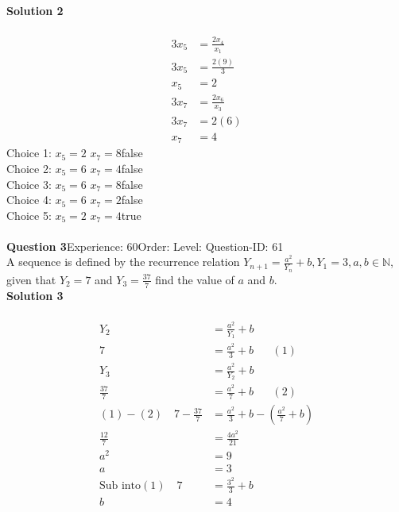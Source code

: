 \documentclass{article}
\begin{document}
\noindent\textbf{Solution 2}\\[2pt]
\\[-35pt]\begin{align*}
3x_5&=\displaystyle\frac{2x_{4}}{x_1}\\[2pt]
3x_5&=\displaystyle\frac{2(9)}{3}\\[2pt]
x_5&=2\\[12pt]
3x_7&=\displaystyle\frac{2x_6}{x_3}\\[2pt]
3x_7&=2(6)\\[2pt]
x_7&=4
\end{align*}
Choice 1: \hspace{20pt}$x_5=2 \,\, x_7=8$\hspace{20pt}false\\
Choice 2: \hspace{20pt}$x_5=6 \,\, x_7=4$\hspace{20pt}false\\
Choice 3: \hspace{20pt}$x_5=6 \,\, x_7=8$\hspace{20pt}false\\
Choice 4: \hspace{20pt}$x_5=6 \,\, x_7=2$\hspace{20pt}false\\
Choice 5: \hspace{20pt}$x_5=2 \,\, x_7=4$\hspace{20pt}true\\
\\[4pt]
\noindent\textbf{Question 3}\hspace{20pt}Experience: 60\hspace{20pt}Order: \hspace{20pt}Level: \hspace{20pt}Question-ID: 61\\[2pt]
A sequence is defined by the recurrence relation $Y_{n+1}=\displaystyle\frac{a^2}{Y_n}+b, Y_1=3, a,b \in \mathbb{N}$, given that $Y_2=7$ and $Y_3=\displaystyle\frac{37}{7}$ find the value of $a$ and $b$.\\[4pt]
\noindent\textbf{Solution 3}\\[2pt]
\\[-35pt]\begin{align*}
Y_2&=\displaystyle\frac{a^2}{Y_1}+b\\[2pt]
7&=\displaystyle\frac{a^2}{3}+b\hspace{20pt}(1)\\[12pt]
Y_3&=\displaystyle\frac{a^2}{Y_2}+b\\[2pt]
\displaystyle\frac{37}{7}&=\displaystyle\frac{a^2}{7}+b\hspace{20pt}(2)\\[2pt]
(1)-(2)\quad 7-\displaystyle\frac{37}{7}&=\frac{a^2}{3}+b-\left(\frac{a^2}{7}+b\right)\\[2pt]
\displaystyle\frac{12}{7}&=\displaystyle\frac{4a^2}{21}\\[2pt]
a^2&=9\\[2pt]
a&=3\\[12pt]
\text{Sub into} (1)\quad 7&=\displaystyle\frac{3^2}{3}+b\\[2pt]
b&=4
\end{align*}
\end{document}
